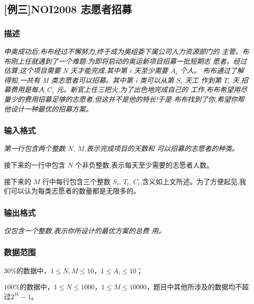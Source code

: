 \subsection{[例三]NOI2008 志愿者招募}
\subsubsection{描述}
{\itshape
	申奥成功后,布布经过不懈努力,终于成为奥组委下属公司人力资源部门的
		主管。布布刚上任就遇到了一个难题:为即将启动的奥运新项目招募一批短期志
		愿者。经过估算,这个项目需要 N 天才能完成,其中第 i 天至少需要 $A_i$ 个人。
		布布通过了解得知,一共有 M 类志愿者可以招募。其中第 i 类可以从第 $S_i$ 天工
		作到第 $T_i$ 天,招募费用是每人 $C_i$ 元。新官上任三把火,为了出色地完成自己的
		工作,布布希望用尽量少的费用招募足够的志愿者,但这并不是他的特长!于是
		布布找到了你,希望你帮他设计一种最优的招募方案。
}
\subsubsection{输入格式}
{\itshape
	第一行包含两个整数 $N$, $M$,表示完成项目的天数和
		可以招募的志愿者的种类。
		\par 接下来的一行中包含 $N$ 个非负整数,表示每天至少需要的志愿者人数。
		\par 接下来的 $M$ 行中每行包含三个整数 $S_i$, $T_i$, $C_i$,含义如上文所述。为了方便起见,我们可以认为每类志愿者的数量都是无限多的。
}

\subsubsection{输出格式}
{\itshape
	仅包含一个整数,表示你所设计的最优方案的总费
		用。
}
\subsubsection{数据范围}
$30\%$的数据中，$1 \le N, M \le 10$，$1 \le A_i \le 10$；
\par $100\%$的数据中，$1 \le N \le 1000$，$1 \le M \le 10000$，题目中其他所涉及的数据均不超过$2^{31}-1$。
